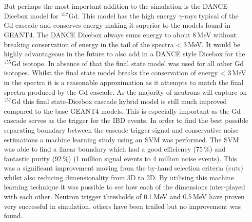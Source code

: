 \\\\But perhaps the most important addition to the simulation is the DANCE Dicebox model for $^{157}$Gd. This model has the high energy $\gamma$-rays typical of the Gd cascade and conserves energy making it superior to the models found in GEANT4. The DANCE Dicebox always sums energy to about 8\,MeV without breaking conservation of energy in the tail of the spectra < 3\,MeV. It would be highly advantageous in the future to also add in a DANCE style Dicebox for the $^{155}$Gd isotope. In absence of that the final state model was used for all other Gd isotopes. Whilst the final state model breaks the conservation of energy < 3\,MeV in the spectra it is a reasonable approximation as it attempts to match the final spectra produced by the Gd cascade. As the majority of neutrons will capture on $^{157}$Gd \cite{Abdushukurov_2010} this final state-Dicebox cascade hybrid model is still much improved compared to the base GEANT4 models. This is especially important as the Gd cascade serves as the trigger for the IBD events. In order to find the best possible separating boundary between the cascade trigger signal and conservative noise estimations a machine learning study using an SVM was performed. The SVM was able to find a linear boundary which had a good efficiency (75\,\%) and fantastic purity (92\,\%) (1 million signal events to 4 million noise events). This was a significant improvement moving from the by-hand selection criteria (cuts) whilst also reducing dimensionality from 3D to 2D. By utilising this machine learning technique it was possible to see how each of the dimensions inter-played with each other. Neutron trigger thresholds of 0.1\,MeV and 0.5\,MeV have proven very successful in simulation, others have been trailed but no improvement was found. 
